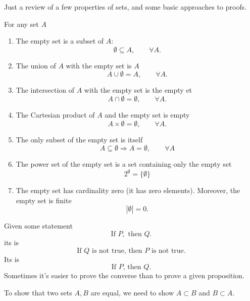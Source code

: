
Just a review of a few properties of sets, and some basic
approaches to proofs.

\begin{prop}\label{prop:emptySets}
  For any set $A$
\begin{enumerate}
\item The empty set is a subset of $A$:
\begin{equation*}
  \emptyset\subseteq A,\qquad\forall A.
\end{equation*}
\item The union of $A$ with the empty set is $A$
\begin{equation*}
  A\cup\emptyset=A,\qquad\forall A.
\end{equation*}
\item The intersection of $A$ with the empty set is the empty et
\begin{equation*}%
  A\cap\emptyset=\emptyset,\qquad\forall A.
\end{equation*}
\item The Cartesian product of $A$ and the empty set is empty
\begin{equation*}%
  A\times\emptyset=\emptyset,\qquad\forall A.
\end{equation*}
\item The only subset of the empty set is itself
\begin{equation*}%
  A\subseteq\emptyset\Rightarrow A=\emptyset,\qquad\forall A
\end{equation*}
\item The power set of the empty set is a set containing only the
  empty set
\begin{equation*}%
  2^{\emptyset}=\{\emptyset\}
\end{equation*}
\item The empty set has cardinality zero (it has zero
  elements). Moreover, the empty set is finite
\begin{equation*}%
  |\emptyset|=0.
\end{equation*}
\end{enumerate}
\end{prop}

Given some statement
\begin{equation}%
\text{If }P,\text{ then }Q.
\end{equation}
its  is 
\begin{equation}%
\text{If }Q\text{ is not true, then }P\text{ is not true.} 
\end{equation}
Its  is 
\begin{equation}%
\text{If }P\text{, then }Q.
\end{equation}
Sometimes it's easier to prove the converse than to prove a given
proposition.

To show that two sets $A, B$ are equal, we need to show $A\subset
B$ and $B\subset A$.
